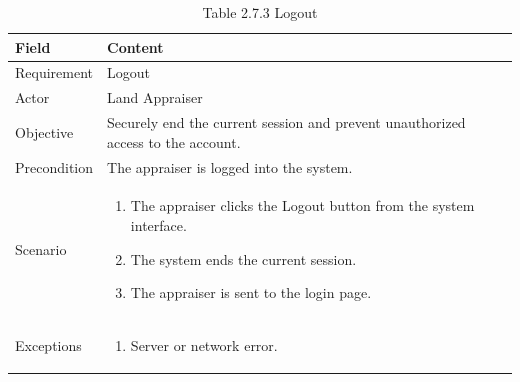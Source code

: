 \documentclass[12pt,oneside]{report}
\begin{document}
\begin{table}[H]
\centering
\caption{Table 2.7.3 Logout}
\label{tab:req-logout}
\begin{tabularx}{\textwidth}{|p{3cm}|X|}
\hline
\textbf{Field} & \textbf{Content} \\ \hline

Requirement & Logout \\ \hline

Actor & Land Appraiser \\ \hline

Objective & Securely end the current session and prevent unauthorized access to the account. \\ \hline

Precondition & The appraiser is logged into the system. \\ \hline

Scenario & 
\begin{minipage}[t]{0.75\textwidth}
\begin{enumerate}[leftmargin=*,label=\arabic*.]
\item The appraiser clicks the Logout button from the system interface.
\item The system ends the current session.
\item The appraiser is sent to the login page.
\end{enumerate}
\end{minipage} \\ \hline

Exceptions & 
\begin{minipage}[t]{0.75\textwidth}
\begin{enumerate}[leftmargin=*,label=\arabic*.]
\item Server or network error.
\end{enumerate}
\end{minipage} \\ \hline
\end{tabularx}
\end{table}
\end{document}
